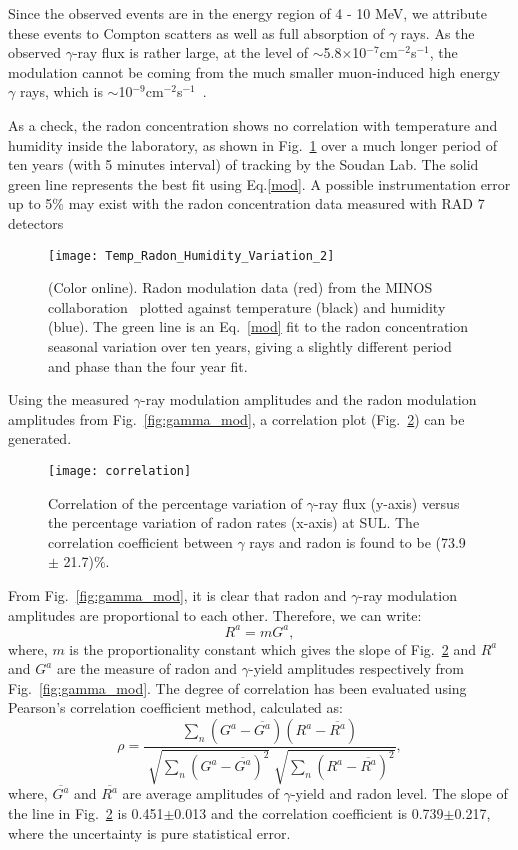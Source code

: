 \documentclass[aps,prc,showpacs,twocolumn,superscriptaddress]{revtex4-1}
\begin{document}
Since the observed events are in the energy region of 4 - 10 MeV, we attribute these events to Compton scatters as well as full absorption of $\gamma$ rays.  As the observed $\gamma$-ray flux is rather large, at the level of $\sim$5.8$\times$10$^{-7}$cm$^{-2}$s$^{-1}$, the modulation cannot be coming from the much smaller muon-induced high energy $\gamma$ rays, which is  $\sim$10$^{-9}$cm$^{-2}$s$^{-1}$~\cite{cmei}. 

As a check, the radon concentration shows no correlation with temperature and humidity inside the laboratory, as shown in Fig.~\ref{fig:radonvariation} over a much longer period of ten years (with 5 minutes interval) of tracking by the Soudan Lab.  The solid  green line represents the best fit using Eq.\ref{mod}.  A possible instrumentation error up to 5\%  may exist with the radon  concentration data measured with RAD 7 detectors~\cite{rad7}

 \begin{figure} [H]
\centering
\texttt{[image: Temp\_Radon\_Humidity\_Variation\_2]}
\caption  {(Color online). Radon modulation data (red) from the MINOS collaboration~\cite{minos} plotted against temperature (black) and humidity (blue).  The green line is an Eq.~\ref{mod} fit to the radon concentration seasonal variation over ten years, giving a slightly different period and phase than the four year fit.} 
\label{fig:radonvariation}
\end{figure}

Using the measured $\gamma$-ray modulation amplitudes and the radon modulation amplitudes from Fig.~\ref{fig:gamma_mod}, a correlation plot (Fig.~\ref{fig:corplot}) can be generated. 
\begin{figure} [H]
\centering
\texttt{[image: correlation]}
\caption  {Correlation of the percentage variation of $\gamma$-ray flux (y-axis) versus the percentage variation of radon rates (x-axis) at SUL. The correlation coefficient between $\gamma$ rays and radon is found to be (73.9$\pm$ 21.7)$\%$.} 
\label{fig:corplot}
\end{figure}
From Fig.~\ref{fig:gamma_mod}, it is clear that radon and $\gamma$-ray modulation amplitudes are proportional to each other. Therefore, we can write:
\begin{equation}
R^{a} = m G^{a},
\end{equation}
where, $m$ is the proportionality constant which gives the slope of Fig.~\ref{fig:corplot} and $R^{a}$ and $G^{a}$ are the measure of radon and $\gamma$-yield amplitudes respectively from Fig.~\ref{fig:gamma_mod}. The degree of correlation has been evaluated using Pearson's correlation coefficient method, calculated as:
\begin{equation}
\rho = \frac{\sum\limits_{n}(G^{a}-\overline{{G^{a}}}) (R^{a}-\overline{{R^{a}}})}{\sqrt[]{\sum\limits_{n}{(G^{a}-\overline{{G^{a}}})^2}}\sqrt[]{\sum\limits_{n}{(R^{a}-\overline{{R^{a}}})^2}}},
\end{equation}
where, $\overline{{G^{a}}}$ and  $\overline{{R^{a}}}$ are average amplitudes of $\gamma$-yield and radon level. The slope of the line in Fig.~\ref{fig:corplot} is 0.451$\pm$0.013 and the correlation coefficient is 0.739$\pm$0.217, where the uncertainty is pure statistical error. 
\end{document}
